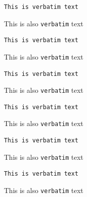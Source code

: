 \begin{verbatim}
This is verbatim text
\end{verbatim}

This is also \texttt{verbatim} text
\begin{verbatim}
This is verbatim text
\end{verbatim}

This is also \texttt{verbatim} text
\begin{verbatim}
This is verbatim text
\end{verbatim}

This is also \texttt{verbatim} text
\begin{frame}[t,fragile]
\begin{verbatim}
This is verbatim text
\end{verbatim}

This is also \texttt{verbatim} text
\end{frame}

\begin{frame}[t,fragile]
\begin{verbatim}
This is verbatim text
\end{verbatim}

This is also \texttt{verbatim} text
\end{frame}

\begin{frame}[t,fragile]
\begin{verbatim}
This is verbatim text
\end{verbatim}

This is also \texttt{verbatim} text
\end{frame}

